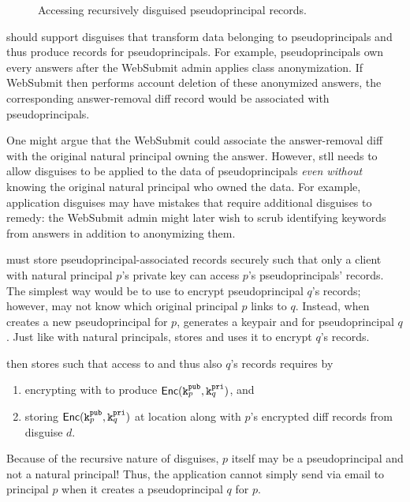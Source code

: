 \begin{figure}[t]
    \centering
    \caption{Accessing recursively disguised pseudoprincipal records.}
    \label{f:recursive}
\end{figure}

\sys should support disguises that transform data belonging to pseudoprincipals and thus produce
records for pseudoprincipals. For example, pseudoprincipals own every answers after the WebSubmit
admin applies class anonymization. If WebSubmit then performs account deletion of these anonymized
answers, the corresponding answer-removal diff record would be associated with pseudoprincipals.

One might argue that the WebSubmit could associate the answer-removal diff with the original natural
principal owning the answer. However, \sys stll needs to allow disguises to be applied to the data
of pseudoprincipals \emph{even without} knowing the original natural principal who owned the data.
For example, application disguises may have mistakes that require additional disguises to remedy:
the WebSubmit admin might later wish to scrub identifying keywords from answers in addition to
anonymizing them.

\sys must store pseudoprincipal-associated records securely such that only a client with natural
principal $p$'s private key can access $p$'s pseudoprincipals' records. The simplest way would be
to use  to encrypt pseudoprincipal $q$'s records; however, \sys may not know which original principal
$p$ links to $q$.
%
Instead, when \sys creates a new pseudoprincipal for $p$, \sys generates a keypair
 and  for pseudoprincipal $q$.
Just like with natural principals, \sys stores  and uses it to encrypt $q$'s records.

\sys then stores  such that access to  and thus also $q$'s records requires
 by
\begin{enumerate}[nosep]
    \item encrypting  with  to produce $\mathsf{Enc}(\texttt{\ensuremath{\texttt{k}^{\text{pub}}_{p}}}, \texttt{\ensuremath{\texttt{k}^{\text{pri}}_{q}}})$, and
    \item storing $\mathsf{Enc}(\texttt{\ensuremath{\texttt{k}^{\text{pub}}_{p}}}, \texttt{\ensuremath{\texttt{k}^{\text{pri}}_{q}}})$ at location  along with $p$'s encrypted diff
records from disguise $d$.
\end{enumerate}

Because of the recursive nature of disguises, $p$ itself may be a pseudoprincipal and not a natural
principal! Thus, the application cannot simply send  via \eg email to principal $p$ when it
creates a pseudoprincipal $q$ for $p$.

